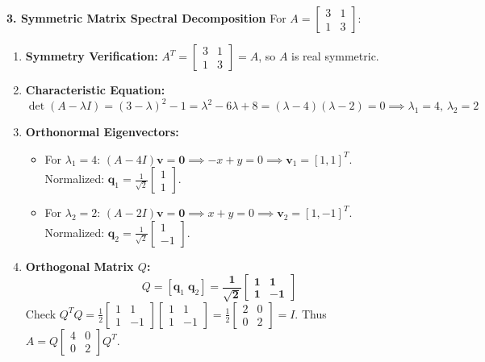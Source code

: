 \textbf{3. Symmetric Matrix Spectral Decomposition}
For $A = \begin{bmatrix} 3 & 1 \\ 1 & 3 \end{bmatrix}$:
\begin{enumerate}
    \item \textbf{Symmetry Verification:} $A^T = \begin{bmatrix} 3 & 1 \\ 1 & 3 \end{bmatrix} = A$, so $A$ is real symmetric.
    \item \textbf{Characteristic Equation:}
    \begin{equation*}
    \det(A - \lambda I) = (3 - \lambda)^2 - 1 = \lambda^2 - 6\lambda + 8 = (\lambda - 4)(\lambda - 2) = 0 \implies \lambda_1 = 4, \, \lambda_2 = 2
    \end{equation*}
    \item \textbf{Orthonormal Eigenvectors:}
    \begin{itemize}
        \item For $\lambda_1 = 4$: $(A - 4I)\mathbf{v} = \mathbf{0} \implies -x + y = 0 \implies \mathbf{v}_1 = [1, 1]^T$.
        Normalized: $\mathbf{q}_1 = \frac{1}{\sqrt{2}} \begin{bmatrix} 1 \\ 1 \end{bmatrix}$.
        \item For $\lambda_2 = 2$: $(A - 2I)\mathbf{v} = \mathbf{0} \implies x + y = 0 \implies \mathbf{v}_2 = [1, -1]^T$.
        Normalized: $\mathbf{q}_2 = \frac{1}{\sqrt{2}} \begin{bmatrix} 1 \\ -1 \end{bmatrix}$.
    \end{itemize}
    \item \textbf{Orthogonal Matrix $Q$:}
    \begin{equation*}
    Q = [\mathbf{q}_1 \; \mathbf{q}_2] = \mathbf{\frac{1}{\sqrt{2}} \begin{bmatrix} 1 & 1 \\ 1 & -1 \end{bmatrix}}
    \end{equation*}
    Check $Q^T Q = \frac{1}{2} \begin{bmatrix} 1 & 1 \\ 1 & -1 \end{bmatrix} \begin{bmatrix} 1 & 1 \\ 1 & -1 \end{bmatrix} = \frac{1}{2} \begin{bmatrix} 2 & 0 \\ 0 & 2 \end{bmatrix} = I$.
    Thus $A = Q \begin{bmatrix} 4 & 0 \\ 0 & 2 \end{bmatrix} Q^T$.
\end{enumerate}

